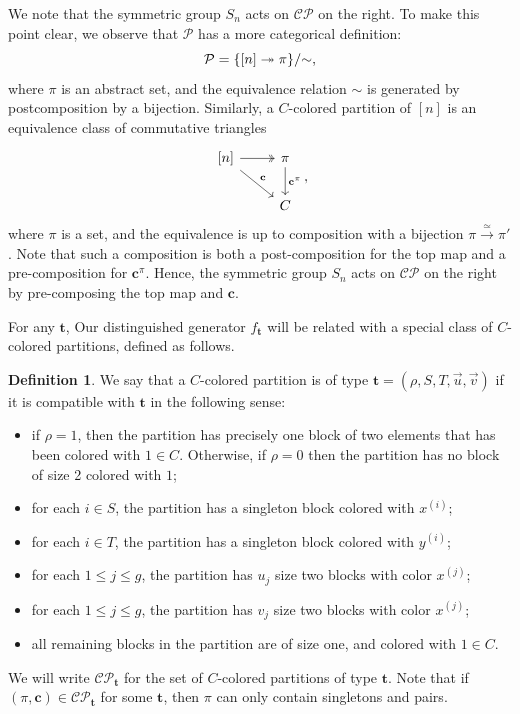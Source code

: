 \documentclass[11pt,reqno]{amsproc}
\numberwithin{equation}{section}
\theoremstyle{definition}
\newtheorem{definition}[theorem]{Definition}
\theoremstyle{remark}
\newcommand\onto{\twoheadrightarrow}
\newcommand{\map}[1][]{{\xrightarrow{#1}}} %
\DeclarePairedDelimiter{\set}{\{}{\}}
\begin{document}
We note that the symmetric group $S_n$ acts on $\mathcal{CP}$ on the right. To make this point clear, we observe that $\mathcal{P}$ has a more categorical definition: 
\[ \mathcal{P}=\set{[n]\onto \pi}/{\sim},\]
where $\pi$ is an abstract set, and the equivalence relation $\sim$ is generated by postcomposition by a bijection. Similarly, a $C$-colored partition of $[n]$ is an equivalence class of commutative triangles
\[
\begin{tikzcd}
\left[ n \right] \arrow[r, two heads] \arrow[dr,"\mathbf{c}"]
& \pi\arrow[d,"\mathbf{c}^\pi"] \\
& C
\end{tikzcd},
\]
where $\pi$ is a set, and the equivalence is up to composition with a bijection $\pi\map[\simeq]\pi'$. Note that such a composition is both a post-composition for the top map and a pre-composition for $\mathbf{c}^\pi$. Hence, the symmetric group $S_n$ acts on $\mathcal{CP}$ on the right by pre-composing the top map and $\mathbf{c}$.

For any $\mathbf{t}$, Our distinguished generator $f_\mathbf{t}$ will be related with a special class of $C$-colored partitions, defined as follows.

\begin{definition}
We say that a $C$-colored partition is of type $\mathbf{t} = (\rho,S,T,\vec{u},\vec{v})$ if it is compatible with $\mathbf{t}$ in the following sense:
\begin{itemize}
    \item if $\rho = 1$, then the partition has precisely one block of two elements that has been colored with $1 \in C$. Otherwise, if $\rho = 0$ then the partition has no block of size 2 colored with $1$;
    \item for each $i \in S$, the partition has a singleton block colored with $x^{(i)}$;
    \item for each $i \in T$, the partition has a singleton block colored with $y^{(i)}$;
    \item for each $1 \leq j \leq g$, the partition has $u_j$ size two blocks with color $x^{(j)}$;
    \item for each $1 \leq j \leq g$, the partition has $v_j$ size two blocks with color $x^{(j)}$;
    \item all remaining blocks in the partition are of size one, and colored with $1 \in C$.
\end{itemize}
We will write $\mathcal{CP_{\mathbf{t}}}$ for the set of $C$-colored partitions of type $\mathbf{t}$. Note that if $(\pi,\mathbf{c})\in \mathcal{CP}_\mathbf{t}$ for some $\mathbf{t}$, then $\pi$ can only contain singletons and pairs.
\end{definition}
\end{document}
